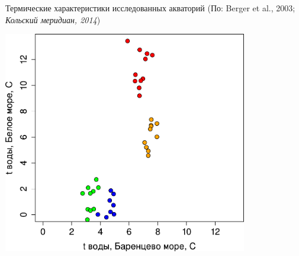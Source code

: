\documentclass{beamer}
\begin{document}
\begin{frame}{Термические характеристики исследованных акваторий}
{\scriptsize (По: Berger et al., 2003; \textit{Кольский меридиан, 2014})}
		\begin{center}
			\includegraphics[width=0.8\textwidth]{temp_White_Barents_big1.pdf}
		\end{center}
\end{frame}
\end{document}
